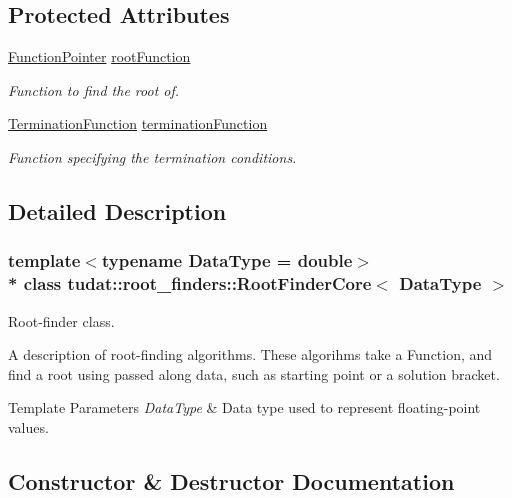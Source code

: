\subsection*{Protected Attributes}
\begin{DoxyCompactItemize}
\item 
\hyperlink{classtudat_1_1root__finders_1_1RootFinderCore_af0bb889d21fa3bc55785021381d3b4b5}{Function\+Pointer} \hyperlink{classtudat_1_1root__finders_1_1RootFinderCore_afbe57f7fa3baba13128d9dc2ca41dedd}{root\+Function}
\begin{DoxyCompactList}\small\item\em Function to find the root of. \end{DoxyCompactList}\item 
\hyperlink{classtudat_1_1root__finders_1_1RootFinderCore_a8dd4dc4316b5e984e279816e0a2b67d5}{Termination\+Function} \hyperlink{classtudat_1_1root__finders_1_1RootFinderCore_a7a1efe7ce979318d398b4bb8574e70d6}{termination\+Function}
\begin{DoxyCompactList}\small\item\em Function specifying the termination conditions. \end{DoxyCompactList}\end{DoxyCompactItemize}


\subsection{Detailed Description}
\subsubsection*{template$<$typename Data\+Type = double$>$\\*
class tudat\+::root\+\_\+finders\+::\+Root\+Finder\+Core$<$ Data\+Type $>$}

Root-\/finder class. 

A description of root-\/finding algorithms. These algorihms take a Function, and find a root using passed along data, such as starting point or a solution bracket. 
\begin{DoxyTemplParams}{Template Parameters}
{\em Data\+Type} & Data type used to represent floating-\/point values. \\
\hline
\end{DoxyTemplParams}


\subsection{Constructor \& Destructor Documentation}
